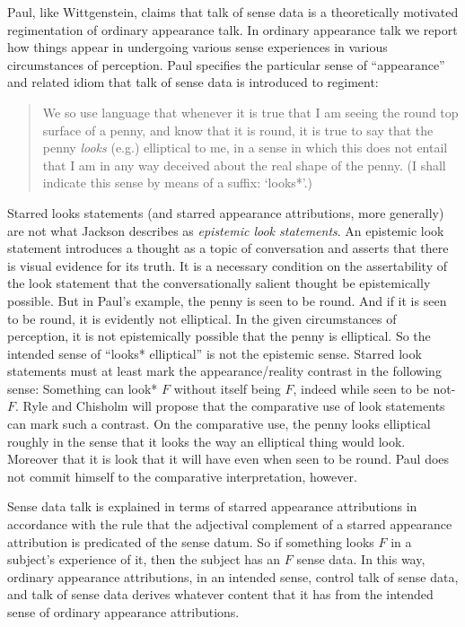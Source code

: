 \documentclass[11pt]{article}
\begin{document}
Paul, like Wittgenstein, claims that talk of sense data is a theoretically motivated regimentation of ordinary appearance talk. In ordinary appearance talk we report how things appear in undergoing various sense experiences in various circumstances of perception. Paul specifies the particular sense of ``appearance'' and related idiom that talk of sense data is introduced to regiment:
\begin{quote}
    We so use language that whenever it is true that I am seeing the round top surface of a penny, and know that it is round, it is true to say that the penny \emph{looks} (e.g.) elliptical to me, in a sense in which this does not entail that I am in any way deceived about the real shape of the penny. (I shall indicate this sense by means of a suffix: `looks*'.)
\end{quote}
Starred looks statements (and starred appearance attributions, more generally) are not what Jackson describes as \emph{epistemic look statements}. An epistemic look statement introduces a thought as a topic of conversation and asserts that there is visual evidence for its truth. It is a necessary condition on the assertability of the look statement that the conversationally salient thought be epistemically possible. But in Paul's example, the penny is seen to be round. And if it is seen to be round, it is evidently not elliptical. In the given circumstances of perception, it is not epistemically possible that the penny is elliptical. So the intended sense of ``looks* elliptical'' is not the epistemic sense. Starred look statements must at least mark the appearance/reality contrast in the following sense: Something can look* \( F \) without itself being \( F \), indeed while seen to be not-\( F \). Ryle and Chisholm will propose that the comparative use of look statements can mark such a contrast. On the comparative use, the penny looks elliptical roughly in the sense that it looks the way an elliptical thing would look. Moreover that it is look that it will have even when seen to be round. Paul does not commit himself to the comparative interpretation, however.

Sense data talk is explained in terms of starred appearance attributions in accordance with the rule that the adjectival complement of a starred appearance attribution is predicated of the sense datum. So if something looks \( F \) in a subject's experience of it, then the subject has an \( F \) sense data. In this way, ordinary appearance attributions, in an intended sense, control talk of sense data, and talk of sense data derives whatever content that it has from the intended sense of ordinary appearance attributions.
\end{document}
